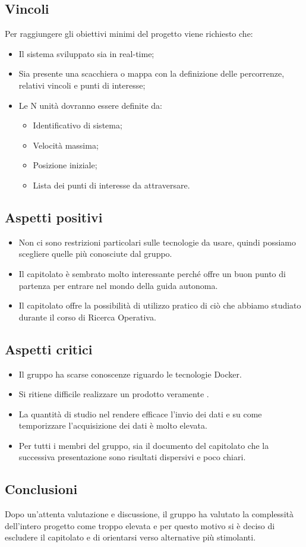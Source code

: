 \subsection{Vincoli}
Per raggiungere gli obiettivi minimi del progetto viene richiesto che:
\begin{itemize}
\item Il sistema sviluppato sia in real-time;
\item Sia presente una scacchiera o mappa con la definizione delle percorrenze, relativi vincoli e punti di interesse;
\item Le N unità dovranno essere definite da:
	\begin{itemize}
	\item Identificativo di sistema;
	\item Velocità massima;
	\item Posizione iniziale;
	\item Lista dei punti di interesse da attraversare.
	\end{itemize}
\end{itemize}

\subsection{Aspetti positivi}
\begin{itemize}
	\item Non ci sono restrizioni particolari sulle tecnologie da usare, quindi possiamo scegliere quelle più conosciute dal gruppo.
	\item Il capitolato è sembrato molto interessante perché offre un buon punto di partenza per entrare nel mondo della guida autonoma.
	\item Il capitolato offre la possibilità di utilizzo pratico di ciò che abbiamo studiato durante il corso di Ricerca Operativa.
\end{itemize}

\subsection{Aspetti critici}
\begin{itemize}
	\item Il gruppo ha scarse conoscenze riguardo le tecnologie Docker.
	\item Si ritiene difficile realizzare un prodotto veramente .
	\item La quantità di studio nel rendere efficace l'invio dei dati e su come temporizzare l'acquisizione dei dati è molto elevata.
	\item Per tutti i membri del gruppo, sia il documento del capitolato che la successiva presentazione sono risultati dispersivi e poco chiari. 
\end{itemize}

\subsection{Conclusioni}
Dopo un'attenta valutazione e discussione, il gruppo ha valutato la complessità dell'intero progetto come troppo elevata e per questo motivo si è deciso di escludere il capitolato e di orientarsi verso alternative più stimolanti.
